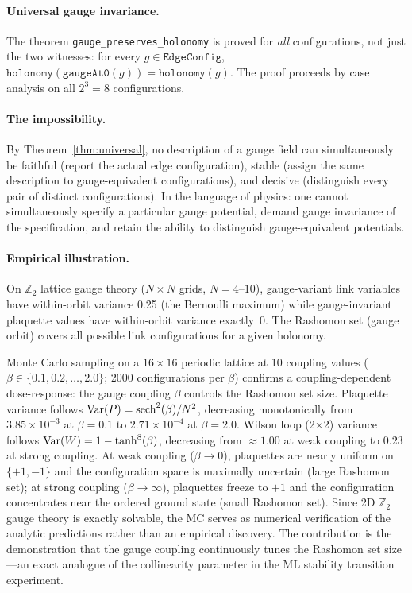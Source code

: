 \paragraph{Universal gauge invariance.}
The theorem \texttt{gauge\_preserves\_holonomy} is proved for \emph{all}
configurations, not just the two witnesses: for every $g \in \texttt{EdgeConfig}$,
$\texttt{holonomy}(\texttt{gaugeAt0}(g)) = \texttt{holonomy}(g)$.  The proof
proceeds by case analysis on all $2^3 = 8$ configurations.

\paragraph{The impossibility.}
By Theorem~\ref{thm:universal}, no description of a gauge field can
simultaneously be faithful (report the actual edge configuration), stable
(assign the same description to gauge-equivalent configurations), and decisive
(distinguish every pair of distinct configurations).  In the language of
physics: one cannot simultaneously specify a particular gauge potential,
demand gauge invariance of the specification, and retain the ability to
distinguish gauge-equivalent potentials.

\paragraph{Empirical illustration.}
On $\mathbb{Z}_2$ lattice gauge theory ($N \times N$ grids, $N = 4$--$10$),
gauge-variant link variables have within-orbit variance 0.25 (the Bernoulli
maximum) while gauge-invariant plaquette values have within-orbit variance
exactly~0.  The Rashomon set (gauge orbit) covers all possible link
configurations for a given holonomy.

Monte Carlo sampling on a $16 \times 16$ periodic lattice at 10 coupling
values ($\beta \in \{0.1, 0.2, \ldots, 2.0\}$; 2000 configurations per
$\beta$) confirms a coupling-dependent dose-response: the gauge coupling
$\beta$ controls the Rashomon set size.  Plaquette variance follows
$\mathrm{Var}(P) = \operatorname{sech}^2(\beta) / N^2$, decreasing monotonically
from $3.85 \times 10^{-3}$ at $\beta = 0.1$ to $2.71 \times 10^{-4}$ at
$\beta = 2.0$.  Wilson loop (2$\times$2) variance follows
$\mathrm{Var}(W) = 1 - \tanh^8(\beta)$, decreasing from ${\approx}1.00$ at weak
coupling to $0.23$ at strong coupling.  At weak coupling ($\beta \to 0$),
plaquettes are nearly uniform on $\{+1, -1\}$ and the configuration space is
maximally uncertain (large Rashomon set); at strong coupling
($\beta \to \infty$), plaquettes freeze to $+1$ and the configuration
concentrates near the ordered ground state (small Rashomon set).  Since 2D $\mathbb{Z}_2$ gauge theory is exactly solvable, the MC
serves as numerical verification of the analytic predictions rather than
an empirical discovery.  The contribution is the demonstration that the
gauge coupling continuously tunes the Rashomon set size---an exact
analogue of the collinearity parameter in the ML stability transition
experiment.

